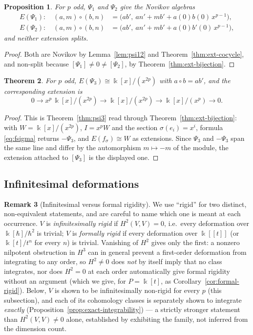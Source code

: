 \documentclass[11pt,reqno]{amsart}
\theoremstyle{plain}
\newtheorem{theorem}{Theorem}[section]
\newtheorem{proposition}[theorem]{Proposition}
\theoremstyle{definition}
\newtheorem{remark}[theorem]{Remark}
\newcommand{\kk}{\Bbbk}
\newcommand{\Ht}{H^2}
\begin{document}
\begin{proposition}\label{prop:E12}
For $p$ odd, $\Psi_1$ and $\Psi_2$ give the Novikov algebras
\begin{align*}
E(\Psi_1):\quad (a,m)\circ(b,n)&=\bigl(ab',\ an'+mb'+a(0)b(0)\,x^{p-1}\bigr),\\
E(\Psi_2):\quad (a,m)\circ(b,n)&=\bigl(ab',\ an'+mb'+a(0)b'(0)\,x^{p-1}\bigr),
\end{align*}
and neither extension splits.
\end{proposition}

\begin{proof}
Both are Novikov by Lemma~\ref{lem:psi12} and Theorem~\ref{thm:ext-cocycle}, and non-split
because $[\Psi_1]\ne0\ne[\Psi_2]$, by Theorem~\ref{thm:ext-bijection}.
\end{proof}

\begin{theorem}\label{thm:E3}
For $p$ odd, $E(\Psi_3)\cong\kk[x]/(x^{2p})$ with $a\circ b=ab'$, and the corresponding
extension is
\[
0\longrightarrow x^p\,\kk[x]/(x^{2p})\longrightarrow \kk[x]/(x^{2p})
\longrightarrow \kk[x]/(x^{p})\longrightarrow 0 .
\]
\end{theorem}

\begin{proof}
This is Theorem~\ref{thm:psi3} read through Theorem~\ref{thm:ext-bijection}: with
$W=\kk[x]/(x^{2p})$, $I=x^pW$ and the section $\sigma(e_i)=x^i$, formula \eqref{eq:fsigma}
returns $-\Psi_3$, and $E(f_\sigma)\cong W$ as extensions. Since $\Psi_3$ and $-\Psi_3$ span
the same line and differ by the automorphism $m\mapsto-m$ of the module, the extension
attached to $[\Psi_3]$ is the displayed one.
\end{proof}

\subsection{Infinitesimal deformations}

\begin{remark}[Infinitesimal versus formal rigidity]\label{rem:rigidity-terms}
We use ``rigid'' for two distinct, non-equivalent statements, and are careful to name which
one is meant at each occurrence. $V$ is \emph{infinitesimally rigid} if $\Ht(V,V)=0$, i.e.\
every deformation over $\kk[\hbar]/\hbar^2$ is trivial; $V$ is \emph{formally rigid} if every
deformation over $\kk[[t]]$ (or $\kk[t]/t^n$ for every $n$) is trivial. Vanishing of $\Ht$
gives only the first: a nonzero nilpotent obstruction in $H^3$ can in general prevent a
first-order deformation from integrating to any order, so $\Ht\ne0$ does \emph{not} by itself
imply that no class integrates, nor does $\Ht=0$ at each order automatically give formal
rigidity without an argument (which we give, for $P=\kk[t]$, as
Corollary~\ref{cor:formal-rigid}). Below, $V$ is shown to be infinitesimally non-rigid for
every $p$ (this subsection), and each of its cohomology classes is separately shown to
integrate \emph{exactly} (Proposition~\ref{prop:exact-integrability}) --- a strictly stronger
statement than $\Ht(V,V)\ne0$ alone, established by exhibiting the family, not inferred from
the dimension count.
\end{remark}
\end{document}
